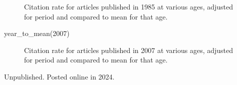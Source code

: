 \documentclass[
  10pt,
  letterpaper,
  DIV=11,
  numbers=noendperiod,
  twoside]{scrartcl}
\newenvironment{Shaded}{\begin{snugshade}}{\end{snugshade}}
\newcommand{\DecValTok}[1]{\textcolor[rgb]{0.68,0.00,0.00}{#1}}
\newcommand{\FunctionTok}[1]{\textcolor[rgb]{0.28,0.35,0.67}{#1}}
\newcommand{\NormalTok}[1]{\textcolor[rgb]{0.00,0.23,0.31}{#1}}
\begin{document}
\begin{figure}[H]


\caption{\label{fig-ytm1985}Citation rate for articles published in 1985
at various ages, adjusted for period and compared to mean for that age.}

\end{figure}%

\begin{Shaded}
\begin{Highlighting}[]
\FunctionTok{year\_to\_mean}\NormalTok{(}\DecValTok{2007}\NormalTok{)}
\end{Highlighting}
\end{Shaded}

\begin{figure}[H]


\caption{\label{fig-ytm2007}Citation rate for articles published in 2007
at various ages, adjusted for period and compared to mean for that age.}

\end{figure}%



\noindent Unpublished. Posted online in 2024.
\end{document}
